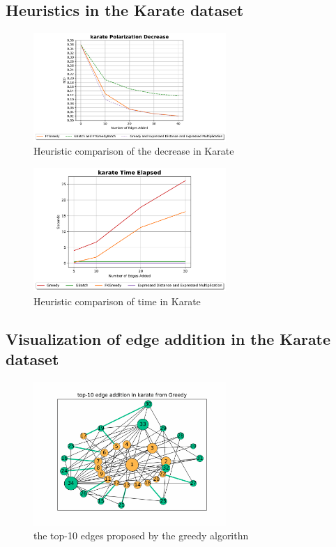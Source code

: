 \subsection{Heuristics in the Karate dataset}


\begin{figure}[!htbp]
	\centering
	\includegraphics[width=0.65\textwidth]{Figures/Karate Polarization Decrease}
	\caption{Heuristic comparison of the decrease in Karate}
	\label{fig:karate_pol}
\end{figure}

\clearpage


\begin{figure}[!htbp]
	\centering
	\includegraphics[width=0.65\textwidth]{Figures/Karate Time Elapsed}
	\caption{Heuristic comparison of time in Karate}
	\label{fig:karate_time}
\end{figure}


\subsection{Visualization of edge addition in  the Karate dataset}

\begin{figure}[!htbp]
	\centering
	\includegraphics[width=0.65\textwidth]{Figures/top-10_karate_greedy}
	\caption{the top-10 edges proposed by the greedy algorithn}
	\label{fig:top-10-karate}
\end{figure}


